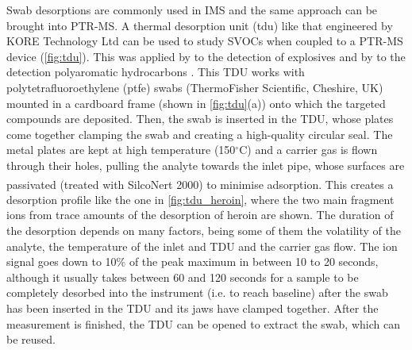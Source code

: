 Swab desorptions are commonly used in  IMS  and the same approach can be brought into PTR-MS.
%
A thermal desorption unit (\acrshort{tdu})  like that engineered by KORE Technology Ltd  can be used to study SVOCs when coupled to a PTR-MS device (\autoref{fig:tdu}).
%
This was applied by \citeauthor{RN445} to the detection of explosives %
and by \citeauthor{blenkhorn2019novel} to the detection polyaromatic hydrocarbons \cite{RN445,blenkhorn2019novel}.
%
This TDU works with polytetrafluoroethylene (\acrshort{ptfe}) swabs (ThermoFisher Scientific, Cheshire, UK) mounted in a cardboard frame (shown in \autoref{fig:tdu}(a)) onto which the targeted compounds are deposited.
%
Then, the swab is inserted in the TDU, whose plates come together clamping the swab and creating a high-quality circular seal. The metal plates are kept at high temperature (150$^{\circ}$C) and a carrier gas is flown through their holes, pulling the analyte towards the inlet pipe, whose surfaces are passivated (treated with SilcoNert\textsuperscript{\textregistered} 2000) to minimise adsorption.
%
This creates a desorption profile like the one in \autoref{fig:tdu_heroin}, where the two main fragment ions from trace amounts of the desorption of heroin are shown.
%
The duration of the desorption depends on many factors, being some of them the volatility of the analyte, the temperature of the inlet and TDU and the carrier gas flow.
%
The ion signal goes down to 10\% of the peak maximum in between 10 to 20 seconds, although
it usually takes between 60 and 120 seconds for a sample to be completely desorbed into the instrument (i.e. to reach baseline) after the swab has been inserted in the TDU and its jaws have clamped together. 
%
After the measurement is finished, the TDU can be opened to extract the swab, which can be reused.








